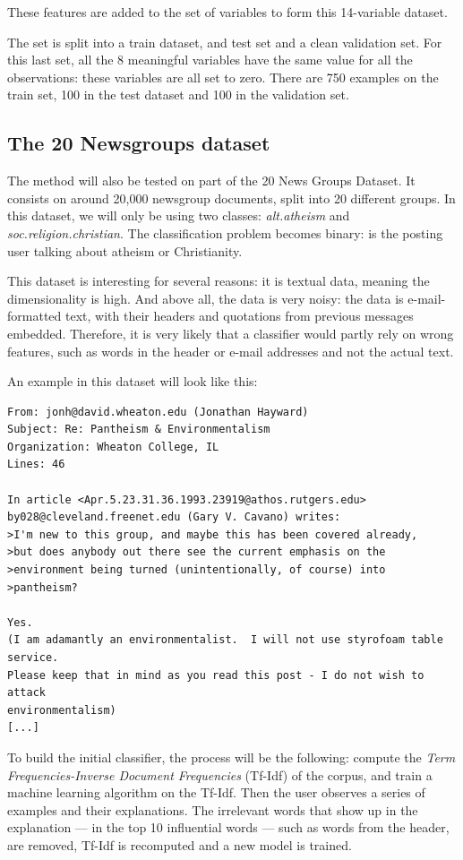 \documentclass[a4paper,11pt]{kth-mag}
\begin{document}
These features are added to the set of variables to form this 14-variable dataset.

The set is split into a train dataset, and test set and a clean validation set. For this last set, all the 8 meaningful variables have the same value for all the observations: these variables are all set to zero. There are 750 examples on the train set, 100 in the test dataset and 100 in the validation set.

\subsection{The 20 Newsgroups dataset}

The method will also be tested on part of the 20 News Groups Dataset. It consists on around 20,000 newsgroup documents, split into 20 different groups. In this dataset, we will only be using two classes: \textit{alt.atheism} and \textit{soc.religion.christian}. The classification problem becomes binary: is the posting user talking about atheism or Christianity. 

This dataset is interesting for several reasons: it is textual data, meaning the dimensionality is high. And above all, the data is very noisy: the data is e-mail-formatted text, with their headers and quotations from previous messages embedded. Therefore, it is very likely that a classifier would partly rely on wrong features, such as words in the header or e-mail addresses and not the actual text.

An example in this dataset will look like this:
\begin{center}
\begin{verbatim}
From: jonh@david.wheaton.edu (Jonathan Hayward)
Subject: Re: Pantheism & Environmentalism
Organization: Wheaton College, IL
Lines: 46

In article <Apr.5.23.31.36.1993.23919@athos.rutgers.edu> by028@cleveland.freenet.edu (Gary V. Cavano) writes:
>I'm new to this group, and maybe this has been covered already,
>but does anybody out there see the current emphasis on the
>environment being turned (unintentionally, of course) into
>pantheism?

Yes.
(I am adamantly an environmentalist.  I will not use styrofoam table service.
Please keep that in mind as you read this post - I do not wish to attack
environmentalism)
[...]
\end{verbatim}
\end{center}

To build the initial classifier, the process will be the following: compute the \textit{Term Frequencies-Inverse Document Frequencies} (Tf-Idf) of the corpus, and train a machine learning algorithm on the Tf-Idf. Then the user observes a series of examples and their explanations. The irrelevant words that show up in the explanation --- in the top 10 influential words --- such as words from the header, are removed, Tf-Idf is recomputed and a new model is trained.
\end{document}

